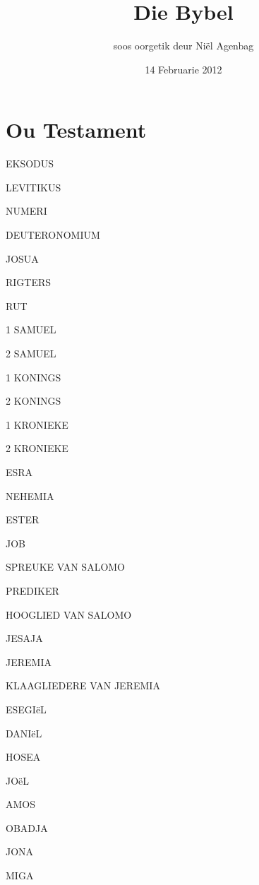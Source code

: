 \documentclass[twoside,twocolumn,letterpaper]{book}
\newcommand{\jnumChapters}{0}
\begin{document}
\frontmatter

\title{Die Bybel}
\date{14 Februarie 2012}
\author{soos oorgetik deur Ni\"el Agenbag}
\setlength{\columnseprule}{0pt}
\maketitle

\mainmatter

\part*{Ou Testament}
\setlength{\columnseprule}{0.0pt}
\renewcommand{\jnumChapters}{0}















EKSODUS

LEVITIKUS

NUMERI

DEUTERONOMIUM

JOSUA

RIGTERS

RUT

1 SAMUEL

2 SAMUEL

1 KONINGS

2 KONINGS

1 KRONIEKE

2 KRONIEKE

ESRA

NEHEMIA

ESTER

JOB




SPREUKE VAN SALOMO

PREDIKER

HOOGLIED VAN SALOMO

JESAJA

JEREMIA

KLAAGLIEDERE VAN JEREMIA

ESEGIëL

DANIëL

HOSEA

JOëL

AMOS

OBADJA

JONA

MIGA
\end{document}
